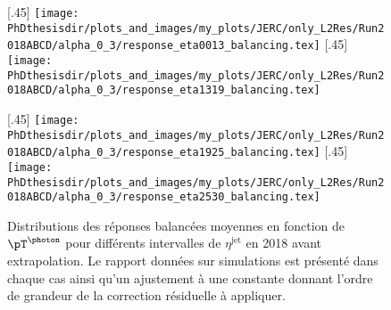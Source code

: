 \begin{figure}[p]
\centering
{}[.45\textwidth]
{\texttt{[image: \\PhDthesisdir/plots\_and\_images/my\_plots/JERC/only\_L2Res/Run2018ABCD/alpha\_0\_3/response\_eta0013\_balancing.tex]}}
\hfill
{}[.45\textwidth]
{\texttt{[image: \\PhDthesisdir/plots\_and\_images/my\_plots/JERC/only\_L2Res/Run2018ABCD/alpha\_0\_3/response\_eta1319\_balancing.tex]}}

\vfill

[.45\textwidth]
{\texttt{[image: \\PhDthesisdir/plots\_and\_images/my\_plots/JERC/only\_L2Res/Run2018ABCD/alpha\_0\_3/response\_eta1925\_balancing.tex]}}
\hfill
{}[.45\textwidth]
{\texttt{[image: \\PhDthesisdir/plots\_and\_images/my\_plots/JERC/only\_L2Res/Run2018ABCD/alpha\_0\_3/response\_eta2530\_balancing.tex]}}

\caption[Réponses balancées en 2018 avant extrapolation.]{Distributions des réponses balancées moyennes en fonction de $\pT^{\text{\photon}}$ pour différents intervalles de $\eta^\text{jet}$ en 2018 avant extrapolation. Le rapport données sur simulations est présenté dans chaque cas ainsi qu'un ajustement à une constante donnant l'ordre de grandeur de la correction résiduelle à appliquer.}
\label{fig-responses_balancing_alpha_0_3_2018ABCD}
\end{figure}